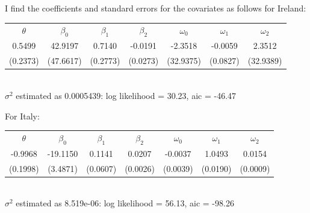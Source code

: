 \documentclass{paper}
\begin{document}
I find the coefficients and standard errors for the covariates as follows for Ireland:

\begin{center}
\begin{tabular}{ c c c c c c c}
 $\theta$ & $\beta_{0}$ & $\beta_{1}$ & $\beta_{2}$ & $\omega_{0}$ & $\omega_{1}$ & $\omega_{2}$\\
 0.5499   &  42.9197    &   0.7140    & -0.0191    & -2.3518  &   -0.0059 & 2.3512\\
 (0.2373) &  (47.6617)  &   (0.2773)  & (0.0273)   & (32.9375)&    (0.0827)& (32.9389)
\end{tabular}\\
$\sigma^2$ estimated as 0.0005439:  log likelihood = 30.23,  aic = -46.47

\end{center}


For Italy:


\begin{center}
\begin{tabular}{ c c c c c c c}
 $\theta$ & $\beta_{0}$ & $\beta_{1}$ & $\beta_{2}$ & $\omega_{0}$ & $\omega_{1}$ & $\omega_{2}$\\

 -0.9968  & -19.1150    &  0.1141     & 0.0207     & -0.0037  &    1.0493 & 0.0154\\
  (0.1998) &  (3.4871)     & (0.0607)      & (0.0026)     & (0.0039)   &   (0.0190) & (0.0009)
\end{tabular}\\

\indent $\sigma^2$ estimated as 8.519e-06:  log likelihood = 56.13,  aic = -98.26\\

\end{center}
\end{document}
